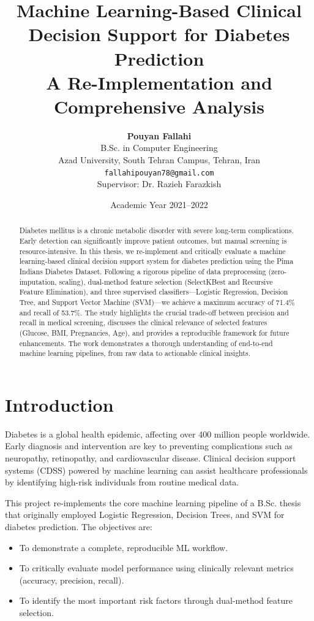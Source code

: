 \documentclass[12pt,a4paper]{article}
\title{\textbf{Machine Learning-Based Clinical Decision Support for Diabetes Prediction}\\ \large A Re-Implementation and Comprehensive Analysis}
\author{\textbf{Pouyan Fallahi}\\[2mm] \small B.Sc. in Computer Engineering \\ \small Azad University, South Tehran Campus, Tehran, Iran \\ \small \texttt{fallahipouyan78@gmail.com} \\[3mm] \small Supervisor: Dr. Razieh Farazkish}
\date{Academic Year 2021--2022}
\begin{document}
\maketitle
\thispagestyle{empty}

\begin{abstract}
Diabetes mellitus is a chronic metabolic disorder with severe long-term complications. Early detection can significantly improve patient outcomes, but manual screening is resource-intensive. In this thesis, we re-implement and critically evaluate a machine learning-based clinical decision support system for diabetes prediction using the Pima Indians Diabetes Dataset. Following a rigorous pipeline of data preprocessing (zero-imputation, scaling), dual-method feature selection (SelectKBest and Recursive Feature Elimination), and three supervised classifiers---Logistic Regression, Decision Tree, and Support Vector Machine (SVM)---we achieve a maximum accuracy of 71.4\% and recall of 53.7\%. The study highlights the crucial trade-off between precision and recall in medical screening, discusses the clinical relevance of selected features (Glucose, BMI, Pregnancies, Age), and provides a reproducible framework for future enhancements. The work demonstrates a thorough understanding of end-to-end machine learning pipelines, from raw data to actionable clinical insights.
\end{abstract}

\newpage
\tableofcontents
\newpage

\section{Introduction}
\label{sec:introduction}

Diabetes is a global health epidemic, affecting over 400 million people worldwide. Early diagnosis and intervention are key to preventing complications such as neuropathy, retinopathy, and cardiovascular disease. Clinical decision support systems (CDSS) powered by machine learning can assist healthcare professionals by identifying high-risk individuals from routine medical data.

This project re-implements the core machine learning pipeline of a B.Sc. thesis that originally employed Logistic Regression, Decision Trees, and SVM for diabetes prediction. The objectives are:
\begin{itemize}
    \item To demonstrate a complete, reproducible ML workflow.
    \item To critically evaluate model performance using clinically relevant metrics (accuracy, precision, recall).
    \item To identify the most important risk factors through dual-method feature selection.
\end{itemize}
\end{document}
